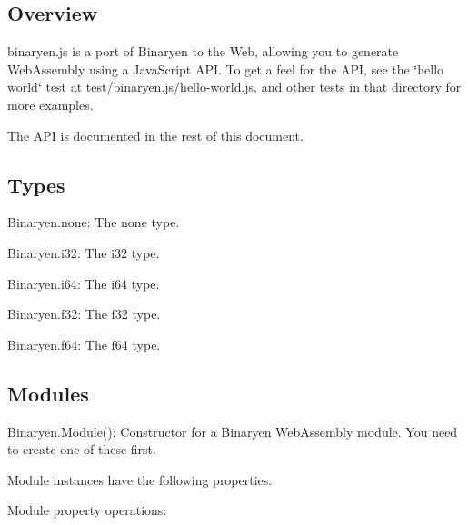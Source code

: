 \subsection*{Overview }

binaryen.\+js is a port of Binaryen to the Web, allowing you to generate Web\+Assembly using a Java\+Script A\+PI. To get a feel for the A\+PI, see the \char`\"{}hello world\char`\"{} test at {\ttfamily test/binaryen.\+js/hello-\/world.js}, and other tests in that directory for more examples.

The A\+PI is documented in the rest of this document.

\subsection*{Types }


\begin{DoxyItemize}
\item {\ttfamily Binaryen.\+none}\+: The none type.
\item {\ttfamily Binaryen.\+i32}\+: The i32 type.
\item {\ttfamily Binaryen.\+i64}\+: The i64 type.
\item {\ttfamily Binaryen.\+f32}\+: The f32 type.
\item {\ttfamily Binaryen.\+f64}\+: The f64 type.
\end{DoxyItemize}

\subsection*{Modules }


\begin{DoxyItemize}
\item {\ttfamily Binaryen.\+Module()}\+: Constructor for a Binaryen Web\+Assembly module. You need to create one of these first.
\end{DoxyItemize}

{\ttfamily Module} instances have the following properties.

Module property operations\+:


